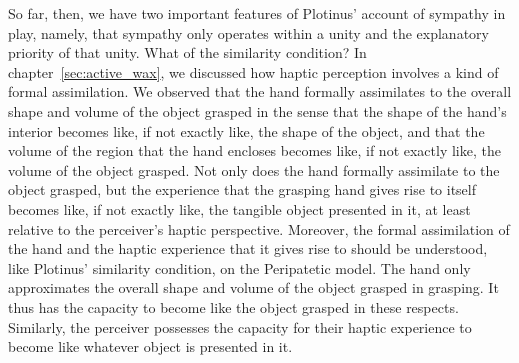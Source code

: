 So far, then, we have two important features of Plotinus' account of sympathy in play, namely, that sympathy only operates within a unity and the explanatory priority of that unity. What of the similarity condition? In chapter~\ref{sec:active_wax}, we discussed how haptic perception involves a kind of formal assimilation. We observed that the hand formally assimilates to the overall shape and volume of the object grasped in the sense that the shape of the hand's interior becomes like, if not exactly like, the shape of the object, and that the volume of the region that the hand encloses becomes like, if not exactly like, the volume of the object grasped. Not only does the hand formally assimilate to the object grasped, but the experience that the grasping hand gives rise to itself becomes like, if not exactly like, the tangible object presented in it, at least relative to the perceiver's haptic perspective. Moreover, the formal assimilation of the hand and the haptic experience that it gives rise to should be understood, like Plotinus' similarity condition, on the Peripatetic model. The hand only approximates the overall shape and volume of the object grasped in grasping. It thus has the capacity to become like the object grasped in these respects. Similarly, the perceiver possesses the capacity for their haptic experience to become like whatever object is presented in it. 

